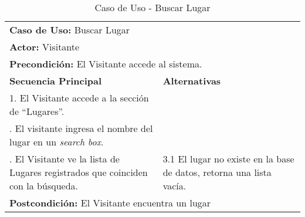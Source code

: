 \begin{table}[H]
  \begin{center}
    \begin{tabularx}{0.75\textwidth}{ X X  }
      \toprule
      \multicolumn{2}{l}{\textbf{Caso de Uso:} Buscar Lugar} \\
      \multicolumn{2}{l}{\textbf{Actor:} Visitante} \\
      \multicolumn{2}{l}{\textbf{Precondición:} El Visitante accede al sistema.} \\
      \addlinespace
      \textbf{Secuencia Principal} & \textbf{Alternativas} \\
      \midrule
      1. El Visitante accede a la sección de ``Lugares''. \\
      \addlinespace
      2. El visitante ingresa el nombre del lugar en un \emph{search box}.  \\
      \addlinespace
      3. El Visitante ve la lista de Lugares registrados que coinciden con la búsqueda. &
      3.1 El lugar no existe en la base de datos, retorna una lista vacía. \\

      \midrule
      \multicolumn{2}{l}{\textbf{Postcondición:} El Visitante encuentra un lugar} \\

      \bottomrule
    \end{tabularx}
    \caption{Caso de Uso - Buscar Lugar}
    \label{tab:cu_buscar_lugar}
  \end{center}
\end{table}


%




